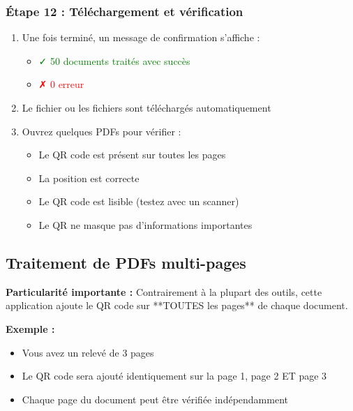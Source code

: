 
\subsubsection{Étape 12 : Téléchargement et vérification}

\begin{enumerate}[leftmargin=*]
    \item Une fois terminé, un message de confirmation s'affiche :
    \begin{itemize}
        \item \textcolor{green}{✓ 50 documents traités avec succès}
        \item \textcolor{red}{✗ 0 erreur}
    \end{itemize}
    \item Le fichier ou les fichiers sont téléchargés automatiquement
    \item Ouvrez quelques PDFs pour vérifier :
    \begin{itemize}
        \item Le QR code est présent sur toutes les pages
        \item La position est correcte
        \item Le QR code est lisible (testez avec un scanner)
        \item Le QR ne masque pas d'informations importantes
    \end{itemize}
\end{enumerate}

\subsection{Traitement de PDFs multi-pages}

\textbf{Particularité importante :} Contrairement à la plupart des outils, cette application ajoute le QR code sur **TOUTES les pages** de chaque document.

\textbf{Exemple :}
\begin{itemize}[leftmargin=*]
    \item Vous avez un relevé de 3 pages
    \item Le QR code sera ajouté identiquement sur la page 1, page 2 ET page 3
    \item Chaque page du document peut être vérifiée indépendamment
\end{itemize}

